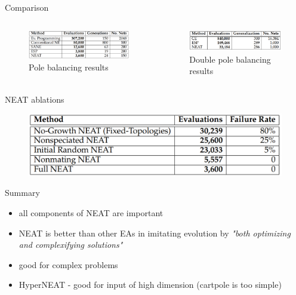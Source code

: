 \documentclass{beamer}
\begin{document}
\begin{frame}{Comparison}
    \begin{columns}
        \begin{column}{0.5\textwidth}
            \begin{figure}[c]
                \includegraphics[width=\textwidth]{img/pole_balancing_table.png}
                \caption{Pole balancing results}
            \end{figure}\end{column}
        \begin{column}{0.5\textwidth}
            \begin{figure}[c]
                \includegraphics[width=\textwidth]{img/double_pole_balancing_table.png}
                \caption{Double pole balancing results}
            \end{figure}
        \end{column}
    \end{columns}
\end{frame}
\begin{frame}{NEAT ablations}
    \begin{figure}[c]
        \includegraphics[width=\textwidth]{img/ablation.png}
    \end{figure}
\end{frame}
\begin{frame}{Summary}
    \begin{itemize}
        \item all components of NEAT are important
        \item NEAT is better than other EAs in imitating evolution by \emph{"both optimizing and complexifying solutions"}
        \item good for complex problems
        \item HyperNEAT - good for input of high dimension (cartpole is too simple)
    \end{itemize}
    
\end{frame}
\end{document}
